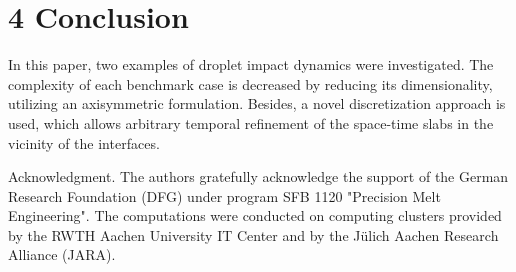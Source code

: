 \documentclass[10pt]{article}
\begin{document}
\section*{4 Conclusion}
In this paper, two examples of droplet impact dynamics were investigated. The complexity of each benchmark case is decreased by reducing its dimensionality, utilizing an axisymmetric formulation. Besides, a novel discretization approach is used, which allows arbitrary temporal refinement of the space-time slabs in the vicinity of the interfaces.

Acknowledgment. The authors gratefully acknowledge the support of the German Research Foundation (DFG) under program SFB 1120 "Precision Melt Engineering". The computations were conducted on computing clusters provided by the RWTH Aachen University IT Center and by the Jülich Aachen Research Alliance (JARA).
\end{document}
